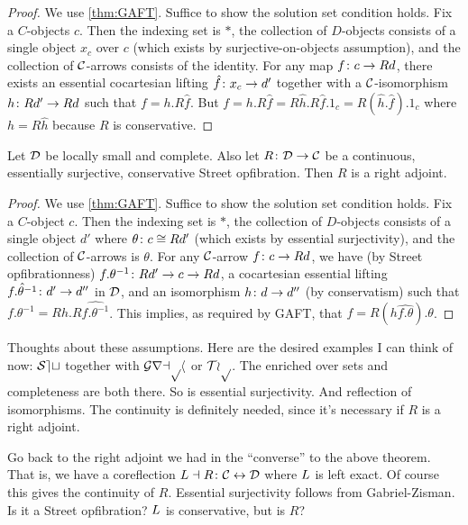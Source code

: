 \documentclass{amsart}
\begin{document}
\begin{proof}
	We use \ref{thm:GAFT}.  Suffice to show the solution set condition holds.  Fix a $ C $-objects $ c $.  Then the indexing set is $ \ast $, the collection of $ D $-objects consists of a single object $ x_c $ over $ c $ (which exists by surjective-on-objects assumption), and the collection of $ \mathcal{C} $-arrows consists of the identity.  For any map $ f \colon c \to Rd $, there exists an essential cocartesian lifting $ \hat{f} \colon x_c \to d' $ together with a $ \mathcal{C} $-isomorphism $ h \colon Rd' \to Rd $ such that $ f = h . R \hat{f} $. But $ f = h . R \hat{f} = R \hat{h} . R \hat{f} . 1_c = R (\hat{h} . \hat{f}) . 1_c $ where $ h = R \hat{h} $ because $ R $ is conservative.
\end{proof}

\begin{thm}
	Let $ \mathcal{D}$ be locally small and complete. Also let $ R \colon \mathcal{D} \to \mathcal{C} $ be a continuous, essentially surjective, conservative Street opfibration.  Then $ R $ is a right adjoint.
\end{thm}

\begin{proof}
	We use \ref{thm:GAFT}.  Suffice to show the solution set condition holds.  Fix a $ C $-object $ c $.  Then the indexing set is $ \ast $, the collection of $ D $-objects consists of a single object $ d' $ where $ \theta \colon c \cong Rd' $ (which exists by essential surjectivity), and the collection of $ \mathcal{C} $-arrows is $ { \theta } $.  For any $ \mathcal{C} $-arrow $ f \colon c \to Rd $, we have (by Street opfibrationness) $ f . \theta^{-1} \colon Rd' \to c \to Rd $, a cocartesian essential lifting $ \hat{ f . \theta^{-1} } \colon d' \to d'' $ in $ \mathcal{D} $, and an isomorphism $ h \colon d \to d'' $ (by conservatism) such that $ f . \theta^{-1} = Rh . R \hat{ f . \theta^{-1} } $.  This implies, as required by GAFT, that $ f = R (h\hat{ f . \theta }) . \theta $.
\end{proof}

Thoughts about these assumptions. Here are the desired examples I can think of now: $ \mathcal{Set} $ together with $ \mathcal{Graph} $ or $ \mathcal{Top} $. The enriched over sets and completeness are both there. So is essential surjectivity. And reflection of isomorphisms.  The continuity is definitely needed, since it's necessary if $ R $ is a right adjoint. 

Go back to the right adjoint we had in the ``converse'' to the above theorem.  That is, we have a coreflection $ L \dashv R \colon \mathcal{C} \leftrightarrow \mathcal{D} $ where $ L $ is left exact.  Of course this gives the continuity of $ R $. Essential surjectivity follows from Gabriel-Zisman. Is it a Street opfibration? $ L $ is conservative, but is $ R $?
\end{document}

